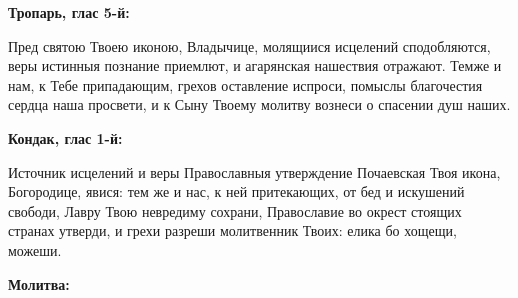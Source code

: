 \bigskip\bigskip\mychapterending

 

\bfseries Тропарь, глас 5-й:\normalfont{}\nopagebreak


Пред святою Твоею иконою, Владычице, молящиися исцелений сподобляются, веры истинныя познание приемлют, и агарянская нашествия отражают. Темже и нам, к Тебе припадающим, грехов оставление испроси, помыслы благочестия сердца наша просвети, и к Сыну Твоему молитву вознеси о спасении душ наших.


\medskip


\bfseries Кондак, глас 1-й:\normalfont{}\nopagebreak


Источник исцелений и веры Православныя утверждение Почаевская Твоя икона, Богородице, явися: тем же и нас, к ней притекающих, от бед и искушений свободи, Лавру Твою невредиму сохрани, Православие во окрест стоящих странах утверди, и грехи разреши молитвенник Твоих: елика бо хощещи, можеши.


\medskip


\bfseries Молитва:\normalfont{}\nopagebreak


